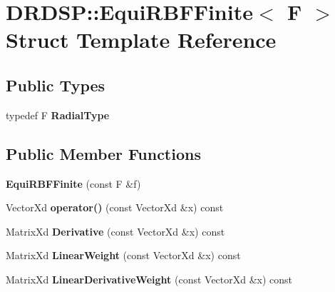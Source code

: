 \hypertarget{struct_d_r_d_s_p_1_1_equi_r_b_f_finite}{\section{D\-R\-D\-S\-P\-:\-:Equi\-R\-B\-F\-Finite$<$ F $>$ Struct Template Reference}
\label{struct_d_r_d_s_p_1_1_equi_r_b_f_finite}
}
\subsection*{Public Types}
\begin{DoxyCompactItemize}
\item 
\hypertarget{struct_d_r_d_s_p_1_1_equi_r_b_f_finite_adb9b01f3272e7ac52fbd5b46c26880f2}{typedef F {\bfseries Radial\-Type}}\label{struct_d_r_d_s_p_1_1_equi_r_b_f_finite_adb9b01f3272e7ac52fbd5b46c26880f2}

\end{DoxyCompactItemize}
\subsection*{Public Member Functions}
\begin{DoxyCompactItemize}
\item 
\hypertarget{struct_d_r_d_s_p_1_1_equi_r_b_f_finite_a82e8171778b1d4fe07bd6b23e26c75ec}{{\bfseries Equi\-R\-B\-F\-Finite} (const F \&f)}\label{struct_d_r_d_s_p_1_1_equi_r_b_f_finite_a82e8171778b1d4fe07bd6b23e26c75ec}

\item 
\hypertarget{struct_d_r_d_s_p_1_1_equi_r_b_f_finite_a9d8ecdcfd2e198265584614aefda826d}{Vector\-Xd {\bfseries operator()} (const Vector\-Xd \&x) const }\label{struct_d_r_d_s_p_1_1_equi_r_b_f_finite_a9d8ecdcfd2e198265584614aefda826d}

\item 
\hypertarget{struct_d_r_d_s_p_1_1_equi_r_b_f_finite_ae535b16ca82be5e97f7e9336cea084fa}{Matrix\-Xd {\bfseries Derivative} (const Vector\-Xd \&x) const }\label{struct_d_r_d_s_p_1_1_equi_r_b_f_finite_ae535b16ca82be5e97f7e9336cea084fa}

\item 
\hypertarget{struct_d_r_d_s_p_1_1_equi_r_b_f_finite_a59f58eae316d14c2fffd53253f56fce2}{Matrix\-Xd {\bfseries Linear\-Weight} (const Vector\-Xd \&x) const }\label{struct_d_r_d_s_p_1_1_equi_r_b_f_finite_a59f58eae316d14c2fffd53253f56fce2}

\item 
\hypertarget{struct_d_r_d_s_p_1_1_equi_r_b_f_finite_adff6b2690e4a2399d437ec2a6e689664}{Matrix\-Xd {\bfseries Linear\-Derivative\-Weight} (const Vector\-Xd \&x) const }\label{struct_d_r_d_s_p_1_1_equi_r_b_f_finite_adff6b2690e4a2399d437ec2a6e689664}

\end{DoxyCompactItemize}
